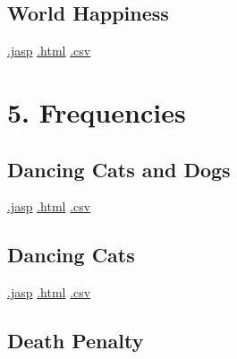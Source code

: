 \documentclass[
  letterpaper,
  DIV=11,
  numbers=noendperiod]{scrreprt}
\begin{document}
\hypertarget{world-happiness}{%
\section{World Happiness}\label{world-happiness}}

\textbar{}
\href{https://github.com/jasp-stats/jasp-data-library/raw/main/World\%20Happiness/World\%20Happiness.jasp}{.jasp}
\textbar{}
\href{https://htmlpreview.github.io/?https://github.com/jasp-stats/jasp-data-library/blob/main/World\%20Happiness/index.html}{.html}
\textbar{}
\href{https://raw.githubusercontent.com/jasp-stats/jasp-data-library/main/World\%20Happiness/World\%20Happiness.csv}{.csv}


\hypertarget{frequencies}{%
\chapter{5. Frequencies}\label{frequencies}}

\hypertarget{dancing-cats-and-dogs}{%
\section{Dancing Cats and Dogs}\label{dancing-cats-and-dogs}}

\textbar{}
\href{https://github.com/jasp-stats/jasp-data-library/raw/main/Dancing\%20Cats\%20and\%20Dogs/Dancing\%20Cats\%20and\%20Dogs.jasp}{.jasp}
\textbar{}
\href{https://htmlpreview.github.io/?https://github.com/jasp-stats/jasp-data-library/blob/main/Dancing\%20Cats\%20and\%20Dogs/index.html}{.html}
\textbar{}
\href{https://raw.githubusercontent.com/jasp-stats/jasp-data-library/main/Dancing\%20Cats\%20and\%20Dogs/Dancing\%20Cats\%20and\%20Dogs.csv}{.csv}

\hypertarget{dancing-cats}{%
\section{Dancing Cats}\label{dancing-cats}}

\textbar{}
\href{https://github.com/jasp-stats/jasp-data-library/raw/main/Dancing\%20Cats/Dancing\%20Cats.jasp}{.jasp}
\textbar{}
\href{https://htmlpreview.github.io/?https://github.com/jasp-stats/jasp-data-library/blob/main/Dancing\%20Cats/index.html}{.html}
\textbar{}
\href{https://raw.githubusercontent.com/jasp-stats/jasp-data-library/main/Dancing\%20Cats/Dancing\%20Cats.csv}{.csv}

\hypertarget{death-penalty}{%
\section{Death Penalty}\label{death-penalty}}
\end{document}
